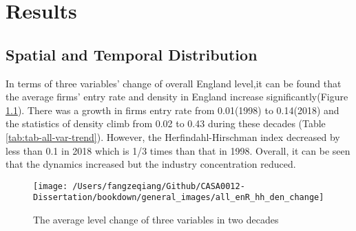\documentclass[
  12pt,
  oneside]{book}
\begin{document}
\hypertarget{results}{%
\chapter{Results}\label{results}}

\hypertarget{spatial-and-temporal-distribution}{%
\section{Spatial and Temporal Distribution}\label{spatial-and-temporal-distribution}}

In terms of three variables' change of overall England level,it can be found that the average firms' entry rate and density in England increase significantly(Figure \ref{fig:fig-all-var-trend}). There was a growth in firms entry rate from 0.01(1998) to 0.14(2018) and the statistics of density climb from 0.02 to 0.43 during these decades (Table \ref{tab:tab-all-var-trend}). However, the Herfindahl-Hirschman index decreased by less than 0.1 in 2018 which is 1/3 times than that in 1998. Overall, it can be seen that the dynamics increased but the industry concentration reduced.

\begin{figure}
\texttt{[image: /Users/fangzeqiang/Github/CASA0012-Dissertation/bookdown/general\_images/all\_enR\_hh\_den\_change]} \caption{The average level change of three variables in two decades}\label{fig:fig-all-var-trend}
\end{figure}
\end{document}
